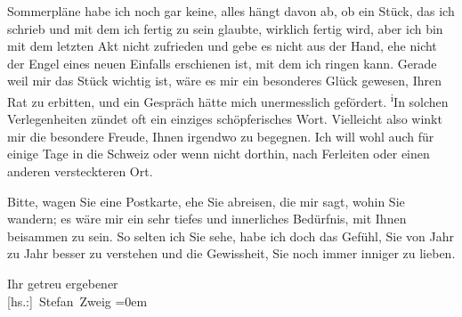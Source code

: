 \pstart
           Sommerpläne habe ich noch gar keine, alles hängt davon ab, ob ein Stück, das ich schrieb und mit dem ich
               fertig zu sein glaubte, wirklich fertig wird, aber ich bin mit dem letzten Akt nicht
               zufrieden und gebe es nicht aus der Hand, ehe nicht der  Engel eines neuen Einfalls erschienen ist, mit dem ich ringen
               kann. Gerade weil mir das Stück wichtig ist, wäre es mir ein besonderes Glück gewesen, Ihren Rat zu
               erbitten, und ein Gespräch hätte mich unermesslich gefördert. \substVorne{}\textsuperscript{i}\substDazwischen{}I\substHinten{}n solchen Verlegenheiten zündet oft ein einziges
               schöpferisches Wort. Vielleicht also winkt mir die besondere Freude, Ihnen irgendwo
               zu begegnen. Ich will wohl auch für einige Tage in die Schweiz oder wenn nicht dorthin, nach Ferleiten oder einen anderen versteckteren Ort.\pend
           
\pstart
           Bitte, wagen Sie eine Postkarte, ehe Sie abreisen, die mir sagt, wohin Sie wandern;
               es wäre mir ein sehr tiefes und innerliches Bedürfnis, mit Ihnen beisammen zu sein.
               So selten ich Sie sehe, habe ich doch das Gefühl, Sie von Jahr zu Jahr besser zu
               verstehen und die Gewissheit, Sie noch immer inniger zu lieben.\pend
           
\pstart
           Ihr getreu ergebener{\\[\baselineskip]}\spacefill\mbox{{[}hs.:{]} Stefan Zweig}\pend
           \leftskip=0em{}\endnumbering{}  \newcommand{\dateiname}{L03690}\newcommand{\titel}{Stefan Zweig an Arthur Schnitzler, 6. 7. 1929}\newcommand{\editorInnen}{Selma Jahnke und Martin Anton Müller}
